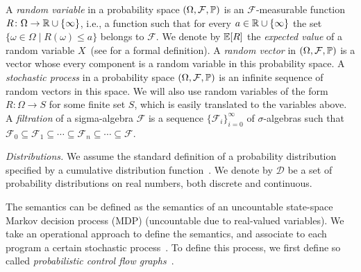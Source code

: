 A \emph{random variable} in a probability space $(\Omega,\mathcal{F},\mathbb{P})$ is
an $\mathcal{F}$-measurable function $R\colon \Omega \rightarrow \mathbb{R} \cup
\{\infty\}$, i.e.,
a function such that for every $a\in \mathbb{R} \cup \{ \infty\}$ the set
$\{\omega\in \Omega\mid R(\omega)\leq a\}$ belongs to $\mathcal{F}$.
We denote by $\mathbb{E}[R]$ the \emph{expected value} of a random variable $X$~(see \cite[Chapter 5]{Billingsley:book}
for a formal definition). 
A \emph{random vector} in $(\Omega,\mathcal{F},\mathbb{P})$ is a vector whose every component is a random 
variable in this probability space. A \emph{stochastic process} in a 
probability space $(\Omega,\mathcal{F},\mathbb{P})$ is an infinite sequence of 
random vectors in this space.
We will also use random variables of the form $R\colon\Omega \rightarrow S$ for some finite 
set $S$, which is easily translated to the variables above.
A \emph{filtration} of a sigma-algebra $\mathcal{F}$ is a
sequence $\{\mathcal{F}_i \}_{i=0}^{\infty}$ of $\sigma$-algebras 
such that $\mathcal{F}_0 \subseteq \mathcal{F}_1 \subseteq \cdots \subseteq
\mathcal{F}_n \subseteq \cdots \subseteq \mathcal{F}$.

\emph{Distributions.} We assume the standard definition of a probability 
distribution specified by a cumulative distribution 
function~\cite{Billingsley:book}. We denote by $\mathcal{D}$ be a set of 
probability distributions on 
real numbers, both discrete and continuous.

\smallskip{}
The semantics can be defined as the semantics of an uncountable state-space
Markov decision process (MDP) (uncountable due to real-valued variables).
We take an operational approach to define the semantics, and associate to each program 
a certain stochastic process~\cite{SriramCAV,HolgerPOPL,Kozen:prob-semantics}.
To define this process, we first define so called 
\emph{probabilistic control flow graphs}~\cite{CFG16:positivstellensatz-arxiv}.

